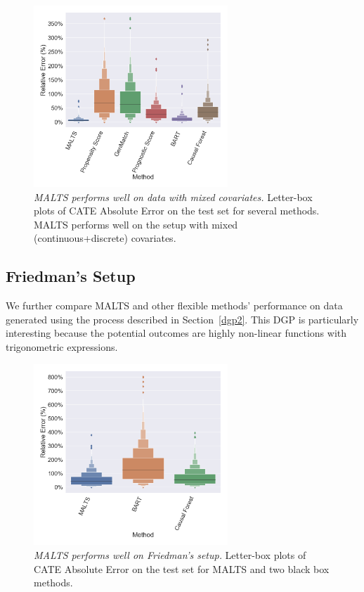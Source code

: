 \begin{figure}[h]
    \centering
    \includegraphics[width=0.65\textwidth]{Figures/boxplot_multifold_malts_mixed.png}
    \caption{{\textit{\it MALTS performs well on data with mixed covariates.}} Letter-box plots of CATE Absolute Error on the test set for several methods. MALTS performs well on the setup with mixed (continuous+discrete) covariates.}
    \label{fig:mixed}
\end{figure}

\subsection{Friedman's Setup}
We further compare MALTS and other flexible methods' performance on data generated using the process described in Section~\ref{dgp2}. 
This DGP is particularly interesting because the potential outcomes are highly non-linear functions with trigonometric expressions.

\begin{figure}[h]
    \centering
    \includegraphics[width=0.65\textwidth]{Figures/boxplot_multifold_malts_friedman_2.png}
    \caption{{\textit{\it MALTS performs well on Friedman's setup.}} Letter-box plots of CATE Absolute Error on the test set for MALTS and two black box methods. 
    }
    \label{fig:Friedman}
\end{figure}

